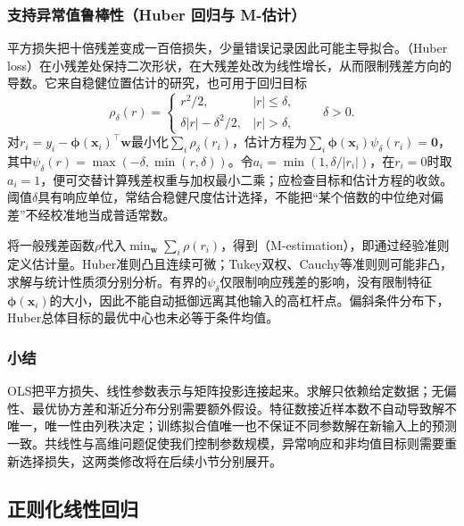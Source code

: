 \subsubsection{支持异常值鲁棒性（Huber 回归与 M-估计）}
\label{sec:regression-huber}

平方损失把十倍残差变成一百倍损失，少量错误记录因此可能主导拟合。（Huber loss）在小残差处保持二次形状，在大残差处改为线性增长，从而限制残差方向的导数。它来自稳健位置估计的研究，也可用于回归目标
\begin{equation}
  \rho_\delta(r)=
  \begin{cases}
    r^2/2,&|r|\leq\delta,\\
    \delta|r|-\delta^2/2,&|r|>\delta,
  \end{cases}
  \qquad\delta>0.
  \label{eq:regression-huber-loss}
\end{equation}
对$r_i=y_i-\bm{\phi}(\bm{x}_i)^{\top}\bm{w}$最小化$\sum_i\rho_\delta(r_i)$，估计方程为$\sum_i\bm{\phi}(\bm{x}_i)\psi_\delta(r_i)=\bm{0}$，其中$\psi_\delta(r)=\max(-\delta,\min(r,\delta))$。令$a_i=\min(1,\delta/|r_i|)$，在$r_i=0$时取$a_i=1$，便可交替计算残差权重与加权最小二乘；应检查目标和估计方程的收敛。阈值$\delta$具有响应单位，常结合稳健尺度估计选择，不能把“某个倍数的中位绝对偏差”不经校准地当成普适常数。

将一般残差函数$\rho$代入$\min_{\bm{w}}\sum_i\rho(r_i)$，得到（M-estimation），即通过经验准则定义估计量。Huber准则凸且连续可微；Tukey双权、Cauchy等准则则可能非凸，求解与统计性质须分别分析。有界的$\psi_\delta$仅限制响应残差的影响，没有限制特征$\bm{\phi}(\bm{x}_i)$的大小，因此不能自动抵御远离其他输入的高杠杆点。偏斜条件分布下，Huber总体目标的最优中心也未必等于条件均值。

\subsubsection{小结}

OLS把平方损失、线性参数表示与矩阵投影连接起来。求解只依赖给定数据；无偏性、最优协方差和渐近分布分别需要额外假设。特征数接近样本数不自动导致解不唯一，唯一性由列秩决定；训练拟合值唯一也不保证不同参数解在新输入上的预测一致。共线性与高维问题促使我们控制参数规模，异常响应和非均值目标则需要重新选择损失，这两类修改将在后续小节分别展开。

\subsection{正则化线性回归}
\label{sec:regression-regularization}

